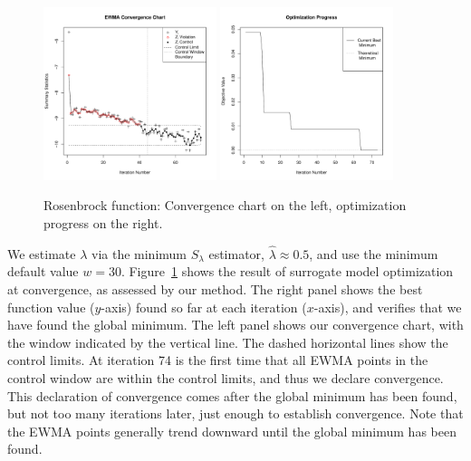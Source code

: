 \documentclass[12pt]{article}
\def \roseLamb {
        0.5     
}
\begin{document}
\begin{figure}[htb]
  \includegraphics[width=0.45\textwidth]{./figures/ewmaConvChartRoseEasyEasyBW.pdf}
  \includegraphics[width=0.45\textwidth]{./figures/bestZRoseEasyEasyEnd.pdf}
  \caption{Rosenbrock function: Convergence chart on the left, optimization progress on the right.}
\label{fig:rosenbrock}
\end{figure}
We estimate $\lambda$ via the minimum $S_\lambda$ estimator, $\hat\lambda\approx\roseLamb$, and use the minimum default value $w=30$.
%
Figure~\ref{fig:rosenbrock} shows the result of surrogate model optimization at convergence, as assessed by our method.  
%
The right panel shows the best function value ($y$-axis) found so far at each iteration ($x$-axis), and verifies that we have found the global minimum. 
%
The left panel shows our convergence chart, with the window indicated by the vertical line.  
%
The dashed horizontal lines show the control limits. 
%
At iteration 74 is the first time that all EWMA points in the control window are within the control limits, and thus we declare convergence.  This declaration of convergence comes after the global minimum has been found, but not too many iterations later, just enough to establish convergence.
%
Note that the EWMA points generally trend downward until the global minimum has been found.  
\end{document}
